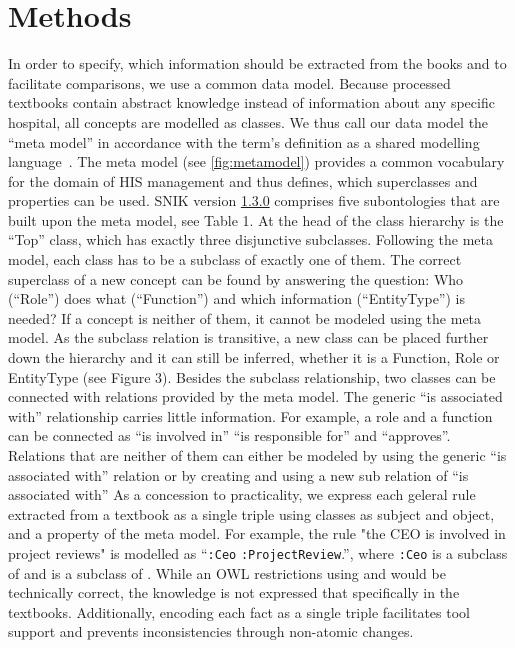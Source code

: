 \documentclass{IOS-Book-Article}     %
\newcommand{\citep}{\cite}%
\newcommand{\snikversion}{1.3.0}
\newcommand{\snikversionlink}{\href{https://github.com/snikproject/ontology/releases/tag/\snikversion}{\snikversion}}
\begin{document}
\section{Methods}

\vspace{-3pt}
In order to specify, which information should be extracted from the books and to facilitate comparisons, we use a common data model.
Because processed textbooks contain abstract knowledge instead of information about any specific hospital, all concepts are modelled as classes.
We thus call our data model the \enquote{meta model} in accordance with the term's definition as a shared modelling language~\citep[p.~8]{ob}.
The meta model (see \cref{fig:metamodel}) provides a common vocabulary for the domain of HIS management and thus defines, which superclasses and properties can be used.
SNIK version \snikversionlink{} comprises five subontologies that are built upon the meta model, see Table 1.
At the head of the class hierarchy is the \enquote{Top} class, which has exactly three disjunctive subclasses.
%
Following the meta model, each class has to be a subclass of exactly one of them.
The correct superclass of a new concept can be found by answering the question: Who (\enquote{Role}) does what (\enquote{Function}) and which information (\enquote{EntityType}) is needed? If a concept is neither of them, it cannot be modeled using the meta model.
As the subclass relation is transitive, a new class can be placed further down the hierarchy and it can still be inferred, whether it is a Function, Role or EntityType (see Figure 3).
Besides the subclass relationship, two classes can be connected with relations provided by the meta model.
The generic \enquote{is associated with} relationship carries little information.
For example, a role and a function can be connected as \enquote{is involved in} \enquote{is responsible for} and \enquote{approves}.
Relations that are neither of them can either be modeled by using the generic \enquote{is associated with} relation or by creating and using a new sub relation of \enquote{is associated with}
%
As a concession to practicality, we express each geleral rule extracted from a textbook as a single triple using classes as subject and object, and a property of the meta model.
For example, the rule "the CEO is involved in project reviews" is modelled as \enquote{\texttt{:Ceo}  \texttt{:ProjectReview}.}, where \texttt{:Ceo} is a subclass of  and  is a subclass of .
While an OWL restrictions using  and  would be technically correct, the knowledge is not expressed that specifically in the textbooks.
Additionally, encoding each fact as a single triple facilitates tool support and prevents inconsistencies through non-atomic changes.
\end{document}
